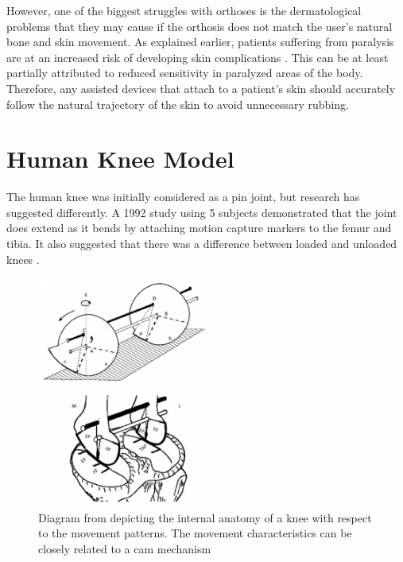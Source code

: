 However, one of the biggest struggles with orthoses is the dermatological problems that they may cause if the orthosis does not match the user's natural bone and skin movement. As explained earlier, patients suffering from paralysis are at an increased risk of developing skin complications \cite{DermatologicalIssuesParalysis}. This can be at least partially attributed to reduced sensitivity in paralyzed areas of the body. Therefore, any assisted devices that attach to a patient's skin should accurately follow the natural trajectory of the skin to avoid unnecessary rubbing.

\section{Human Knee Model}
\label{sec:KneeModel}

The human knee was initially considered as a pin joint, but research has suggested differently. A 1992 study using 5 subjects demonstrated that the joint does extend as it bends by attaching motion capture markers to the femur and tibia. It also suggested that there was a difference between loaded and unloaded knees \cite{3DKinKneeJointOldStabby}. 

\begin{figure}[ht!]
    \centering
    \includegraphics[width=0.5\textwidth]{Figures/Background/KneeAnatomy1.png}
    \caption{Diagram from \cite{MRIKneeShape_Unloaded} depicting the internal anatomy of a knee with respect to the movement patterns. The movement characteristics can be closely related to a cam mechanism}
    \label{fig:KneeAnatomyCam}
\end{figure}

